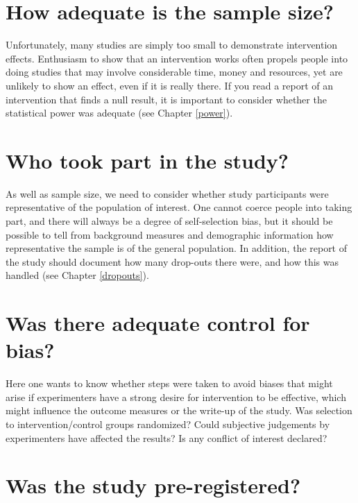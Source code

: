 \documentclass{krantz}
\begin{document}
\hypertarget{how-adequate-is-the-sample-size}{%
\section{How adequate is the sample size?}\label{how-adequate-is-the-sample-size}}

Unfortunately, many studies are simply too small to demonstrate intervention effects. Enthusiasm to show that an intervention works often propels people into doing studies that may involve considerable time, money and resources, yet are unlikely to show an effect, even if it is really there. If you read a report of an intervention that finds a null result, it is important to consider whether the statistical power was adequate (see Chapter \ref{power}).

\hypertarget{who-took-part-in-the-study}{%
\section{Who took part in the study?}\label{who-took-part-in-the-study}}

As well as sample size, we need to consider whether study participants were representative of the population of interest. One cannot coerce people into taking part, and there will always be a degree of self-selection bias, but it should be possible to tell from background measures and demographic information how representative the sample is of the general population. In addition, the report of the study should document how many drop-outs there were, and how this was handled (see Chapter \ref{dropouts}).

\hypertarget{was-there-adequate-control-for-bias}{%
\section{Was there adequate control for bias?}\label{was-there-adequate-control-for-bias}}

Here one wants to know whether steps were taken to avoid biases that might arise if experimenters have a strong desire for intervention to be effective, which might influence the outcome measures or the write-up of the study. Was selection to intervention/control groups randomized? Could subjective judgements by experimenters have affected the results? Is any conflict of interest declared?

\hypertarget{was-the-study-pre-registered}{%
\section{Was the study pre-registered?}\label{was-the-study-pre-registered}}
\end{document}
